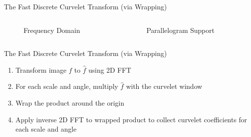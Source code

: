 \documentclass[mathserif]{beamer}
\begin{document}
\begin{frame}{The Fast Discrete Curvelet Transform (via Wrapping)}
    \begin{columns}
        \begin{column}{.5\textwidth}
            \begin{figure}
                
                \caption{Frequency Domain}
            \end{figure}
        \end{column}
        \begin{column}{.5\textwidth}
            \begin{figure}
                
                \caption{Parallelogram Support}
            \end{figure}
        \end{column}
    \end{columns}
\end{frame}

\begin{frame}{The Fast Discrete Curvelet Transform (via Wrapping)}
    \begin{enumerate}
        \item Transform image $f$ to $\hat{f}$ using 2D FFT
        \item For each scale and angle, multiply $\hat{f}$ with the curvelet window
        \item Wrap the product around the origin
        \item Apply inverse 2D FFT to wrapped product to collect curvelet coefficients for each scale and angle
    \end{enumerate}
\end{frame}
\end{document}
